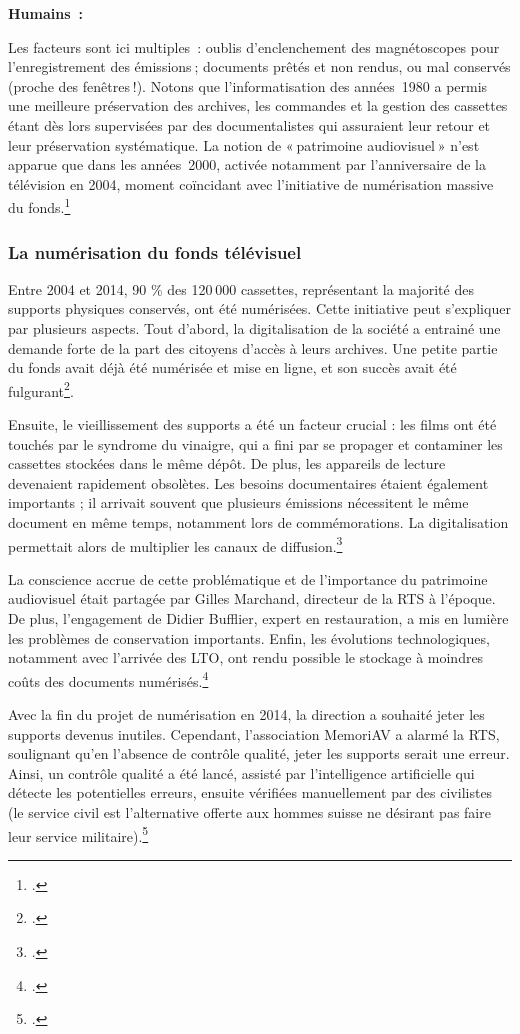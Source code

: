 \textbf{Humains :}

Les facteurs sont ici multiples : oublis d’enclenchement des magnétoscopes pour l’enregistrement des émissions ; documents prêtés et non rendus, ou mal conservés (proche des fenêtres !). Notons que l’informatisation des années 1980 a permis une meilleure préservation des archives, les commandes et la gestion des cassettes étant dès lors supervisées par des documentalistes qui assuraient leur retour et leur préservation systématique. La notion de « patrimoine audiovisuel » n’est apparue que dans les années 2000, activée notamment par l'anniversaire de la télévision en 2004, moment coïncidant avec l’initiative de numérisation massive du fonds.\footcite{barcella2024a}

\subsubsection{La numérisation du fonds télévisuel}

Entre 2004 et 2014, 90 \% des 120 000 cassettes, représentant la majorité des supports physiques conservés, ont été numérisées. Cette initiative peut s’expliquer par plusieurs aspects. Tout d’abord, la digitalisation de la société a entrainé une demande forte de la part des citoyens d’accès à leurs archives. Une petite partie du fonds avait déjà été numérisée et mise en ligne, et son succès avait été fulgurant\footcite{rezzonico2023}.

Ensuite, le vieillissement des supports a été un facteur crucial : les films ont été touchés par le syndrome du vinaigre, qui a fini par se propager et contaminer les cassettes stockées dans le même dépôt. De plus, les appareils de lecture devenaient rapidement obsolètes. Les besoins documentaires étaient également importants ; il arrivait souvent que plusieurs émissions nécessitent le même document en même temps, notamment lors de commémorations. La digitalisation permettait alors de multiplier les canaux de diffusion.\footcite{barcella2024a}

La conscience accrue de cette problématique et de l’importance du patrimoine audiovisuel était partagée par Gilles Marchand, directeur de la RTS à l’époque. De plus, l’engagement de Didier Bufflier, expert en restauration, a mis en lumière les problèmes de conservation importants. Enfin, les évolutions technologiques, notamment avec l’arrivée des LTO, ont rendu possible le stockage à moindres coûts des documents numérisés.\footcite{barcella2024a}

Avec la fin du projet de numérisation en 2014, la direction a souhaité jeter les supports devenus inutiles. Cependant, l’association MemoriAV a alarmé la RTS, soulignant qu’en l’absence de contrôle qualité, jeter les supports serait une erreur. Ainsi, un contrôle qualité a été lancé, assisté par l’intelligence artificielle qui détecte les potentielles erreurs, ensuite vérifiées manuellement par des civilistes (le service civil est l'alternative offerte aux hommes suisse ne désirant pas faire leur service militaire).\footcite{barcella2024a}

